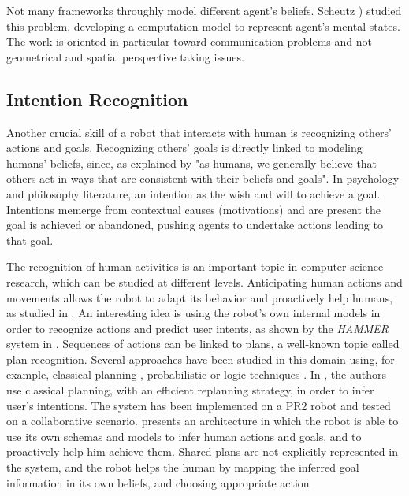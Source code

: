Not many frameworks throughly model different agent's beliefs.  Scheutz \cite{scheutz2013computational}) studied this problem, developing a computation model to represent agent's mental states. The work is oriented in particular toward communication problems and not geometrical and spatial perspective taking issues.

\subsection{Intention Recognition}
Another crucial skill of a robot that interacts with human is recognizing others' actions and goals. Recognizing others' goals is directly linked to modeling humans' beliefs, since, as explained by \cite{byom2013theory} "as humans, we generally believe that others act in ways that are consistent with their beliefs and goals". In psychology \cite{bruner1981} and philosophy \cite{bratman1984} literature, an intention as the wish and will to achieve a goal. Intentions memerge from contextual causes (motivations) and are present the goal is achieved or abandoned, pushing agents to undertake actions leading to that goal.

The recognition of human activities is an important topic in computer science research, which can be studied at different levels. Anticipating human actions and movements allows the robot to adapt its behavior and proactively help humans, as studied in \cite{koppula2013anticipating}. An interesting idea is using the robot's own internal models in order to recognize actions and predict user intents, as shown by the \textit{HAMMER} system in \cite{demiris2007prediction}. Sequences of actions can be linked to plans, a well-known topic called plan recognition. Several approaches have been studied in this domain using, for example, classical planning \cite{ramirez2009plan}, probabilistic \cite{bui2003general} or logic techniques \cite{singla2011abductive}.  In \cite{talamadupula2014coordination}, the authors use classical planning, with an efficient replanning strategy, in order to infer user's intentions. The system has been implemented on a PR2 robot and tested on a collaborative scenario. \cite{breazeal2009embodied} presents an architecture in which the robot is able to use its own schemas and models to infer human actions and goals, and to proactively help him achieve them. Shared plans are not explicitly represented in the system, and the robot helps the human by mapping the inferred goal information in its own beliefs, and choosing appropriate action

